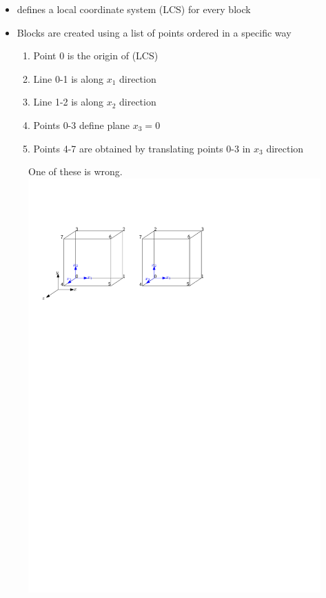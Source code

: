 \begin{frame}
    \begin{itemize}
        \setitemsep{1em}
        \item \openfoam{} defines a local coordinate system (LCS) for every block
        \item Blocks are created using a list of points ordered in a specific way
        \begin{enumerate}
            \item Point 0 is the origin of (LCS)
            \item Line 0-1 is along $x_1$ direction
            \item Line 1-2 is along $x_2$ direction
            \item Points 0-3 define plane $x_3=0$
            \item Points 4-7 are obtained by translating points 0-3 in $x_3$ direction
        \end{enumerate}
    \end{itemize}
    \begin{figure}
        \centering
        One of these is wrong.\\[0.5em]
        \includegraphics[width=0.8\linewidth]{blockmesh_ordering}
    \end{figure}
\end{frame}

